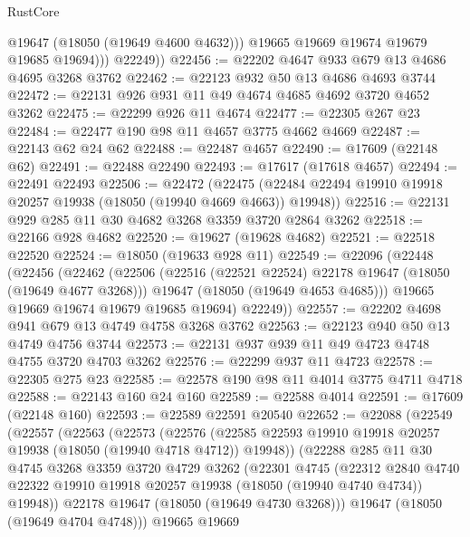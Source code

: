 \begin{lexlean}{RustCore}
\begin{coremodule}
                @19647
                (@18050 (@19649 @4600 @4632)))
              @19665
              @19669
              @19674
              @19679
              @19685
              @19694)))
        @22249))
@22456 := @22202 @4647 @933 @679 @13 @4686 @4695 @3268 @3762
@22462 := @22123 @932 @50 @13 @4686 @4693 @3744
@22472 := @22131 @926 @931 @11 @49 @4674 @4685 @4692 @3720 @4652 @3262
@22475 := @22299 @926 @11 @4674
@22477 := @22305 @267 @23
@22484 := @22477 @190 @98 @11 @4657 @3775 @4662 @4669
@22487 := @22143 @62 @24 @62
@22488 := @22487 @4657
@22490 := @17609 (@22148 @62)
@22491 := @22488 @22490
@22493 := @17617 (@17618 @4657)
@22494 := @22491 @22493
@22506 := @22472
    (@22475 (@22484 @22494 @19910 @19918 @20257 @19938 (@18050 (@19940 @4669 @4663)) @19948))
@22516 := @22131 @929 @285 @11 @30 @4682 @3268 @3359 @3720 @2864 @3262
@22518 := @22166 @928 @4682
@22520 := @19627 (@19628 @4682)
@22521 := @22518 @22520
@22524 := @18050 (@19633 @928 @11)
@22549 := @22096
    (@22448
      (@22456
        (@22462
          (@22506
            (@22516 (@22521 @22524) @22178 @19647 (@18050 (@19649 @4677 @3268)))
            @19647
            (@18050 (@19649 @4653 @4685)))
          @19665
          @19669
          @19674
          @19679
          @19685
          @19694)
        @22249))
@22557 := @22202 @4698 @941 @679 @13 @4749 @4758 @3268 @3762
@22563 := @22123 @940 @50 @13 @4749 @4756 @3744
@22573 := @22131 @937 @939 @11 @49 @4723 @4748 @4755 @3720 @4703 @3262
@22576 := @22299 @937 @11 @4723
@22578 := @22305 @275 @23
@22585 := @22578 @190 @98 @11 @4014 @3775 @4711 @4718
@22588 := @22143 @160 @24 @160
@22589 := @22588 @4014
@22591 := @17609 (@22148 @160)
@22593 := @22589 @22591 @20540
@22652 := @22088
    (@22549
      (@22557
        (@22563
          (@22573
            (@22576
              (@22585 @22593 @19910 @19918 @20257 @19938 (@18050 (@19940 @4718 @4712)) @19948))
            (@22288
              @285
              @11
              @30
              @4745
              @3268
              @3359
              @3720
              @4729
              @3262
              (@22301
                @4745
                (@22312
                  @2840
                  @4740
                  @22322
                  @19910
                  @19918
                  @20257
                  @19938
                  (@18050 (@19940 @4740 @4734))
                  @19948))
              @22178
              @19647
              (@18050 (@19649 @4730 @3268)))
            @19647
            (@18050 (@19649 @4704 @4748)))
          @19665
          @19669

\end{coremodule}
\end{lexlean}
